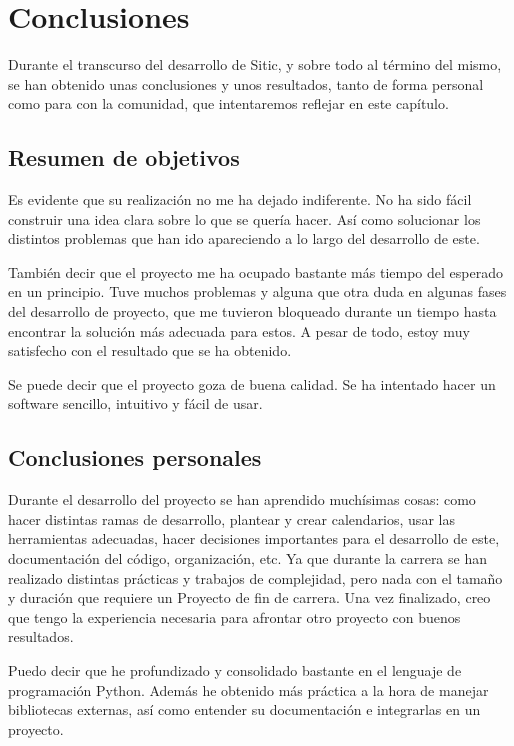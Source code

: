 \documentclass[a4paper,12pt]{article}
\begin{document}

\section{Conclusiones}

Durante el transcurso del desarrollo de Sitic, y sobre todo al término del mismo,
se han obtenido unas conclusiones y unos resultados, tanto de forma personal
como para con la comunidad, que intentaremos reflejar en este capítulo.

\subsection{Resumen de objetivos}

Es evidente que su realización no me ha dejado indiferente. No ha sido fácil construir una idea
clara sobre lo que se quería hacer. Así como solucionar los distintos problemas que han ido apareciendo
a lo largo del desarrollo de este.

También decir que el proyecto me ha ocupado bastante más tiempo del esperado en un principio. Tuve
muchos problemas y alguna que otra duda en algunas fases del desarrollo de proyecto, que me tuvieron
bloqueado durante un tiempo hasta encontrar la solución más adecuada para estos. A pesar de todo,
estoy muy satisfecho con el resultado que se ha obtenido.

Se puede decir que el proyecto goza de buena calidad. Se ha intentado hacer un software sencillo,
intuitivo y fácil de usar.

\subsection{Conclusiones personales}

Durante el desarrollo del proyecto se han aprendido muchísimas cosas: como hacer distintas ramas de
desarrollo, plantear y crear calendarios, usar las herramientas adecuadas, hacer decisiones importantes
para el desarrollo de este, documentación del código, organización, etc. Ya que durante la carrera se
han realizado distintas prácticas y trabajos de complejidad, pero nada con el tamaño y duración que
requiere un Proyecto de fin de carrera. Una vez finalizado, creo que tengo la experiencia necesaria
para afrontar otro proyecto con buenos resultados.

Puedo decir que he profundizado y consolidado bastante en el lenguaje de programación Python.
Además he obtenido más práctica a la hora de manejar bibliotecas
externas, así como entender su documentación e integrarlas en un proyecto.
\end{document}
